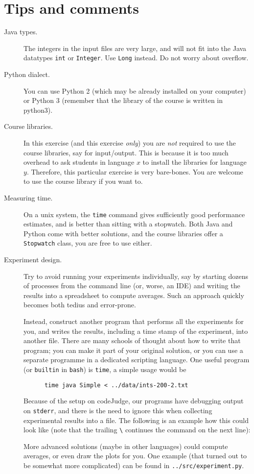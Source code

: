 \documentclass{tufte-handout}
\begin{document}
\section{Tips and comments}

\begin{description}
  \item[Java types.] The integers in the input files are very large, and will not fit into the Java datatypes \texttt{int} or \texttt{Integer}.
    Use \texttt{Long} instead.
    Do not worry about overflow.
  \item[Python dialect.] You can use Python 2 (which may be already installed on your computer) or Python 3 (remember that the library of the course is written in python3).
  \item[Course libraries.]
    In this exercise (and this exercise \emph{only}) you are \emph{not} required to use the course libraries, say for input/output.
    This is because it is too much overhead to ask students in language $x$ to install the libraries for language $y$.
    Therefore, this particular exercise is very bare-bones.
    You are welcome to use the course library if you want to.
  \item[Measuring time.]
    On a unix system, the \texttt{time} command gives sufficiently good performance estimates, and is better than sitting with a stopwatch.
    Both Java and Python come with better solutions, and the course libraries offer a \texttt{Stopwatch} class, you are free to use either. 
  \item[Experiment design.]
    Try to avoid running your experiments individually, say by starting dozens of processes from the command line (or, worse, an IDE) and writing the results into a spreadsheet to compute averages.
    Such an approach quickly becomes both tedius and error-prone.

    Instead, construct another program that performs all the experiments for you, and writes the results, including a time stamp of the experiment, into another file.
    There are many schools of thought about how to write that program; you can make it part of your original solution, or you can use a separate programme in a dedicated scripting language.
    One useful program (or \texttt{builtin} in \texttt{bash}) is \texttt{time}, a simple usage would be 
    \begin{lstlisting}
      time java Simple < ../data/ints-200-2.txt
    \end{lstlisting}
    Because of the setup on codeJudge, our programs have debugging output on \texttt{stderr}, and there is the need to ignore this when collecting experimental results into a file. 
    The following is an example how this could look like (note that the trailing \verb+\+ continues the command on the next line):
    

    More advanced solutions (maybe in other languages) could compute averages, or even draw the plots for you.
    One example (that turned out to be somewhat more complicated) can be found in \texttt{../src/experiment.py}.
\end{description}
\end{document}
